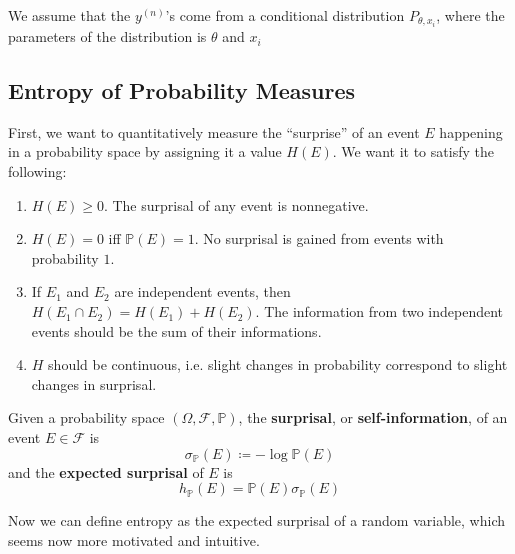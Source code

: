 \documentclass{article}
\begin{document}
    We assume that the $y^{(n)}$'s come from a conditional distribution $P_{\theta, x_i}$, where the parameters of the distribution is $\theta$ and $x_i$ 
  
  \subsection{Entropy of Probability Measures}

    First, we want to quantitatively measure the ``surprise'' of an event $E$ happening in a probability space by assigning it a value $H(E)$. We want it to satisfy the following: 
    \begin{enumerate}
      \item $H(E) \geq 0$. The surprisal of any event is nonnegative. 
      \item $H(E) = 0$ iff $\mathbb{P}(E) = 1$. No surprisal is gained from events with probability $1$. 
      \item If $E_1$ and $E_2$ are independent events, then $H(E_1 \cap E_2) = H(E_1) + H(E_2)$. The information from two independent events should be the sum of their informations. 
      \item $H$ should be continuous, i.e. slight changes in probability correspond to slight changes in surprisal. 
    \end{enumerate}

    \begin{definition}[Surprisal]
      Given a probability space $(\Omega, \mathcal{F}, \mathbb{P})$, the \textbf{surprisal}, or \textbf{self-information}, of an event $E \in \mathcal{F}$ is 
      \begin{equation}
        \sigma_\mathbb{P} (E) \coloneqq - \log \mathbb{P}(E)
      \end{equation}
      and the \textbf{expected surprisal} of $E$ is 
      \begin{equation}
        h_\mathbb{P} (E) = \mathbb{P}(E) \sigma_\mathbb{P} (E)
      \end{equation}
    \end{definition}

    Now we can define entropy as the expected surprisal of a random variable, which seems now more motivated and intuitive. 
\end{document}
